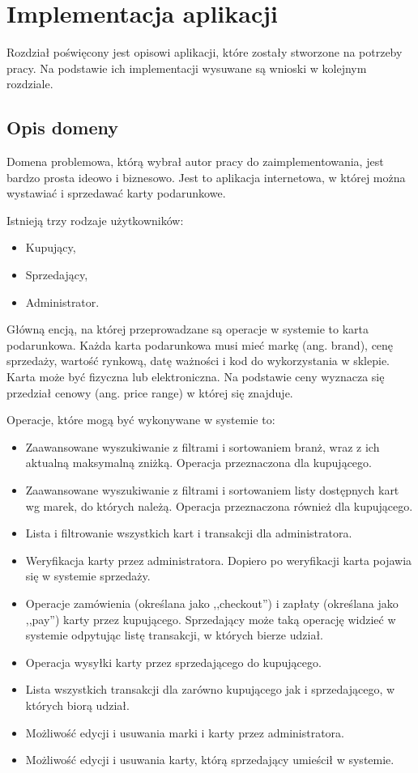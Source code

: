 \chapter{Implementacja aplikacji}
Rozdział poświęcony jest opisowi aplikacji, które zostały stworzone na potrzeby pracy.
Na podstawie ich implementacji wysuwane są wnioski w kolejnym rozdziale.

\section{Opis domeny}
Domena problemowa, którą wybrał autor pracy do zaimplementowania, jest bardzo prosta ideowo i biznesowo. Jest to aplikacja internetowa, w której można wystawiać i sprzedawać karty podarunkowe.

Istnieją trzy rodzaje użytkowników:
\begin{itemize}
    \item Kupujący,
    \item Sprzedający,
    \item Administrator.
\end{itemize}

Główną encją, na której przeprowadzane są operacje w systemie to karta podarunkowa. 
Każda karta podarunkowa musi mieć markę (ang. brand), cenę sprzedaży, wartość rynkową, datę ważności i kod do wykorzystania w sklepie. Karta może być fizyczna lub elektroniczna. Na podstawie ceny wyznacza się przedział cenowy (ang. price range) w której się znajduje.

Operacje, które mogą być wykonywane w systemie to:
\begin{itemize}
    \item Zaawansowane wyszukiwanie z filtrami i sortowaniem branż, wraz z ich aktualną maksymalną zniżką. Operacja przeznaczona dla kupującego.
    \item Zaawansowane wyszukiwanie z filtrami i sortowaniem listy dostępnych kart wg marek, do których należą. Operacja przeznaczona również dla kupującego.
    \item Lista i filtrowanie wszystkich kart i transakcji dla administratora.
    \item Weryfikacja karty przez administratora. Dopiero po weryfikacji karta pojawia się w systemie sprzedaży.
    \item Operacje zamówienia (określana jako ,,checkout'') i zapłaty (określana jako ,,pay'') karty przez kupującego. Sprzedający może taką operację widzieć w systemie odpytując listę transakcji, w których bierze udział.
    \item Operacja wysyłki karty przez sprzedającego do kupującego.
    \item Lista wszystkich transakcji dla zarówno kupującego jak i sprzedającego, w których biorą udział.
    \item Możliwość edycji i usuwania marki i karty przez administratora.
    \item Możliwość edycji i usuwania karty, którą sprzedający umieścił w systemie.
\end{itemize}

